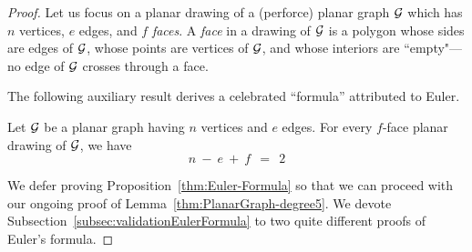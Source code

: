 \begin{proof}
Let us focus on a planar drawing of a (perforce) planar graph $\mbox{$\cal G$}$ which has $n$ vertices, $e$ edges, and $f$ {\it faces}.  A {\it face} in a drawing of $\mbox{$\cal G$}$ is a polygon whose sides are edges of
$\mbox{$\cal G$}$, whose points are vertices of $\mbox{$\cal G$}$, and whose interiors are ``empty"---no edge of $\mbox{$\cal G$}$ crosses through a face.

\bigskip

\noindent {}
\bigskip

The following auxiliary result derives a celebrated ``formula'' attributed to Euler.

 

\begin{prop} 
\label{thm:Euler-Formula}
Let $\mbox{$\cal G$}$ be a planar graph having $n$ vertices and $e$ edges.  For every $f$-face planar drawing of $\mbox{$\cal G$}$, we have
\begin{equation}
\label{eqn:Eulers-formula}
n \ - \ e \ + \ f \ \ = \ \ 2
\end{equation}
\end{prop}

\medskip

We defer proving Proposition~\ref{thm:Euler-Formula} so that we can proceed with our ongoing proof of Lemma~\ref{thm:PlanarGraph-degree5}.  We devote Subsection~\ref{subsec:validationEulerFormula} to two quite different proofs of Euler's formula.

\medskip



\end{proof}
